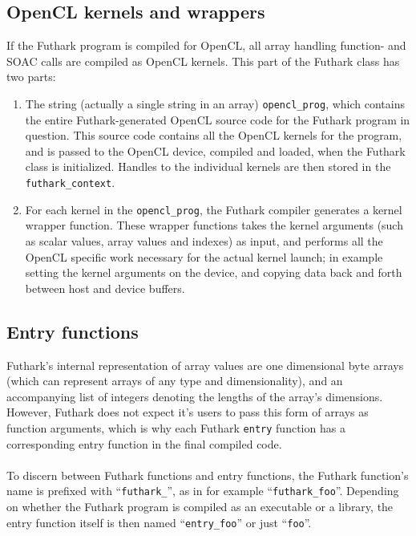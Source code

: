 \subsection{OpenCL kernels and wrappers}
  If the Futhark program is compiled for OpenCL, all array handling function- and
  SOAC calls are compiled as OpenCL kernels. This part of the Futhark class
  has two parts:
  \begin{enumerate}
  \item The string (actually a single string in an array) \texttt{opencl\_prog}, which contains the entire
  Futhark-generated OpenCL source code for the Futhark program in question.
  This source code contains all the OpenCL kernels for the program, and is
  passed to the OpenCL device, compiled and loaded, when the Futhark class is
  initialized. Handles to the individual kernels are then stored in the \texttt{futhark\_context}.

  \item For each kernel in the \texttt{opencl\_prog}, the Futhark compiler
    generates a kernel wrapper function. These wrapper functions takes the
    kernel arguments (such as scalar values, array values and indexes) as input,
    and performs all the OpenCL specific work necessary for the actual kernel
    launch; in example setting the kernel arguments on the device, and copying
    data back and forth between host and device buffers.
  \end{enumerate}

\subsection{Entry functions}
Futhark's internal representation of array values are one dimensional byte
arrays (which can represent arrays of any type and dimensionality), and an
accompanying list of integers denoting the lengths of the array's dimensions.
However, Futhark does not expect it's users to pass this form of arrays as
function arguments, which is why each Futhark \texttt{entry} function has a
corresponding entry function in the final compiled code.
\\\\
To discern between Futhark functions and entry functions, the Futhark function's
name is prefixed with ``\texttt{futhark\_}'', as in for example
``\texttt{futhark\_foo}''.
Depending on whether the Futhark program is compiled as an executable or a
library, the entry function itself is then named ``\texttt{entry\_foo}'' or
just ``\texttt{foo}''.

